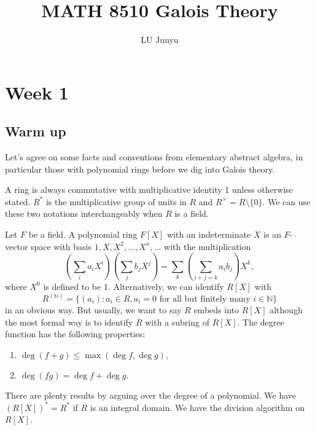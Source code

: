 \documentclass[12pt]{article}
\theoremstyle{definition}
\theoremstyle{definition}
\def\NN{\mathbb{N}}
\begin{document}
\title{MATH 8510 Galois Theory}
\author{LU Junyu}


\maketitle

\section*{Week 1}
\label{Week 1}
\subsection{Warm up}

Let's agree on some facts and conventions from elementary abstract algebra, in particular those with polynomial rings before we dig into Galois theory.

\smallskip

A ring is always commutative with multiplicative identity 1 unless otherwise stated. $R^*$ is the multiplicative group of units in $R$ and $R^\times = R\setminus \{0\}$. We can use these two notations interchangeably when $R$ is a field.

\smallskip

Let $F$ be a field. A polynomial ring $F[X]$ with an indeterminate $X$ is an $F$-vector space with basis $1,X,X^2,...,X^n,...$ with the multiplication $$(\sum_i a_iX^i)(\sum_j b_j X^j) =  \sum_k (\sum_{i+j=k}a_ib_j)X^k,$$ where $X^0$ is defined to be 1. Alternatively, we can identify $R[X]$ with $$R^{(\NN)}=\{(a_i): a_i\in R, a_i=0 \mbox{ for all but finitely many }i\in\NN\}$$ in an obvious way. But usually, we want to say $R$ embeds into $R[X]$ although the most formal way is to identify $R$ with a subring of $R[X]$. The degree function has the following properties:
\begin{enumerate}
    \item $\deg(f+g) \leq \max(\deg f,\deg g),$
    \item $\deg(fg)=\deg f+\deg g.$
\end{enumerate}

There are plenty results by arguing over the degree of a polynomial. We have $(R[X])^* =  R^*$ if $R$ is an integral domain. We have the division algorithm on $R[X]$.
\end{document}
